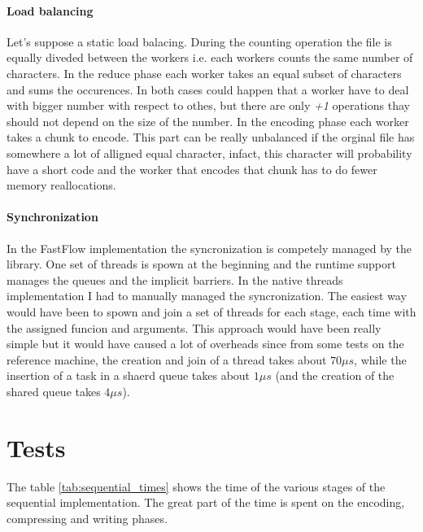 \documentclass[12pt, letterpaper]{article}
\begin{document}
\paragraph*{Load balancing}
Let's suppose a static load balacing. During the counting operation the file is equally diveded between the workers i.e. each workers counts the same
number of characters. In the reduce phase each worker takes an equal subset of characters and sums the occurences.
In both cases could happen that a worker have to deal with bigger number with respect to othes, but there are 
only \textit{+1} operations thay should not depend on the size of the number. In the encoding phase each
worker takes a chunk to encode. This part can be really unbalanced if the orginal file has somewhere a lot of 
alligned equal character, infact, this character will probability have a short code and the worker 
that encodes that chunk has to do fewer memory reallocations.

\paragraph*{Synchronization}
In the FastFlow implementation the syncronization is competely managed by the library. One set of threads
is spown at the beginning and the runtime support manages the queues and the implicit barriers.
In the native threads implementation I had to manually managed the syncronization. The easiest way
would have been to spown and join a set of threads for each stage, each time with the assigned funcion 
and arguments. This approach would have been really simple but it would have caused a lot of overheads since
from some tests on the reference machine, the creation and join of a thread takes about $70 \mu s$, while the 
insertion of a task in a shaerd queue takes about $1 \mu s$ (and the creation of the shared queue takes $4 \mu s$).




\section{Tests \label{sec:tests}}

The table \ref{tab:sequential_times} shows the time of the various stages of the sequential implementation. The great part of the time is spent on the encoding, compressing and writing phases.
\end{document}
